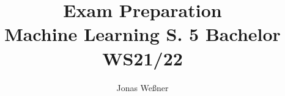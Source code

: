 \documentclass{article}
\begin{document}
\title{Exam Preparation\\Machine Learning S. 5 Bachelor WS21/22}
\author{Jonas Weßner}
\maketitle
\tableofcontents


\end{document}
